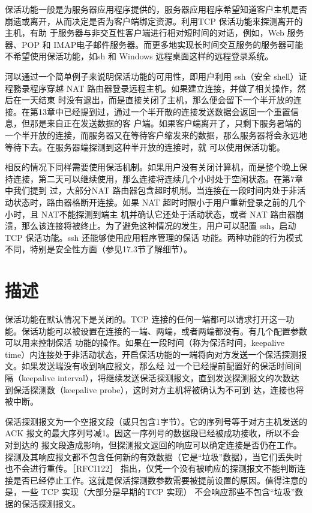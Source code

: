 保活功能一般是为服务器应用程序提供的，服务器应用程序希望知道客户主机是否崩遗或离开，从而决定是否为客户端绑定资源。利用TCP 保活功能来探测离开的主机，有助
于服务器与非交互性客户端进行相对短时间的对话，例如，Web 服务器、POP 和 IMAP电子邮件服务器。而更多地实现长时间交互服务的服务器可能不希望使用保活功能，如sh 和
Windows 远程桌面这样的远程登录系统。

河以通过一个简单例子来说明保活功能的可用性，即用户利用 ssh（安全 shell）证程務录程序穿越 NAT 路由器登录远程主机。如果建立连接，并做了相关操作，然后在一天结東
时没有退出，而是直接关闭了主机，那么便会留下一个半开放的连接。在第13章中已经提到过，通过一个半开散的连接发送数据会返回一个重置信息，但那是来自正在发送数据的客
户端。如果客户端离开了，只剩下服务暑端的一个半开放的连接，而服务器又在等待客户缩发来的数据，那么服务器将会永远地等待下去。在服务器端探测到这种半开放的连接时，就
可以使用保活功能。

相反的情况下同样需要使用保活机制。如果用户没有关闭计算机，而是整个晚上保持连接，第二天可以继续使用，那么连接将连续几个小时处于空闲状态。在第7章中我们提到
过，大部分NAT 路由器包含超时机制。当连接在一段时间内处于非活动状态时，路由器格断开连接。如果 NAT 超时时限小于用户重新登录之前的几个小时，且 NAT不能探测到端主
机并确认它还处于活动状态，或者 NAT 路由器崩溃，那么该连接将被终止。为了避免这种情况的发生，用户可以配置 ssh，启动 TCP 保活功能。ssh 还能够使用应用程序管理的保话
功能。两种功能的行为模式不同，特别是安全性方面（参见17.3节了解细节）。

\section{描述}
保活功能在默认情况下是关闭的。TCP 连接的任何一端都可以请求打开这一功能。保话功能可以被设置在连接的一端、两端，或者两端都没有。有几个配置参数可以用来控制保活
功能的操作。如果在一段时间（称为保活时间，keepalive time）内连接处于非活动状态，开启保活功能的一端将向对方发送一个保活探测报文。如果发送端没有收到响应报文，那么经
过一个已经提前配置好的保活时间间隔（keepalive interval），将继续发送保活探测报文，直到发送探测报文的次数达到保活探测数（keepalive probe），这时对方主机将被确认为不可到
达，连接也将被中断。

保活探测报文为一个空报文段（或只包含1字节）。它的序列号等于对方主机发送的ACK 报文的最大序列号减1。因这一序列号的数据段已经被成功接收，所以不会对到达的
报文段造成影响，但探测报文返回的响应可以确定连接是否仍在工作。探测及其响应报文都不包含任何新的有效数据（它是“垃圾”数据），当它们丢失时也不会进行重传。［RFCI122］
指出，仅凭一个没有被响应的探测报文不能判断连接是否已经停止工作。这就是保活探测数参数需要被提前设置的原因。值得注意的是，一些 TCP 实现（大部分是早期的TCP 实现）
不会响应那些不包含“垃圾”数据的保活探测报文。

